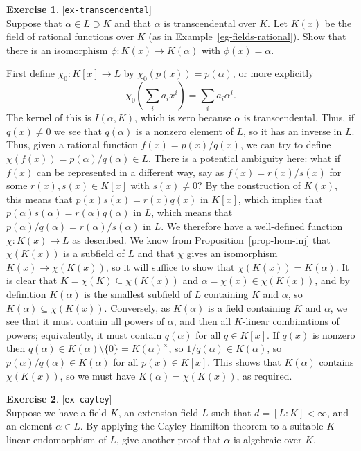 \documentclass{amsart}
\newcommand{\al}        {\alpha}
\newcommand{\sm}        {\setminus}
\newcommand{\tm}        {\times}
\newcommand{\sse}       {\subseteq}
\renewcommand{\:}{\colon}
\newcommand{\lastexlabel}{}
\newcommand{\exlabel}[1]{
 \global\def\lastexlabel{#1}\label{#1}[\texttt{#1}]\ \\
}
\newcommand{\exlabel}[1]{
 \global\def\lastexlabel{#1}\label{#1}
}
\newenvironment{solution}{\SolutionInline}{\endSolutionInline}
\theoremstyle{definition}
\newtheorem{exercise}{Exercise}[section]
\renewenvironment{solution}{\SolutionAtEnd}{\endSolutionAtEnd}
\begin{document}
\begin{exercise}\exlabel{ex-transcendental}
 Suppose that $\al\in L\supset K$ and that $\al$ is transcendental
 over $K$.  Let $K(x)$ be the field of rational functions over $K$ (as
 in Example~\ref{eg-fields-rational}).  Show that there is an
 isomorphism $\phi\:K(x)\to K(\al)$ with $\phi(x)=\al$.
\end{exercise}
\begin{solution}
 First define $\chi_0\:K[x]\to L$ by $\chi_0(p(x))=p(\al)$, or more
 explicitly 
 \[ \chi_0(\sum_ia_ix^i) = \sum_ia_i\al^i. \]
 The kernel of this is $I(\al,K)$, which is zero because $\al$ is
 transcendental.  Thus, if $q(x)\neq 0$ we see that $q(\al)$ is a
 nonzero element of $L$, so it has an inverse in $L$.  Thus, given a
 rational function $f(x)=p(x)/q(x)$, we can try to define
 $\chi(f(x))=p(\al)/q(\al)\in L$.  There is a potential ambiguity
 here: what if $f(x)$ can be represented in a different way, say as
 $f(x)=r(x)/s(x)$ for some $r(x),s(x)\in K[x]$ with $s(x)\neq 0$?  By
 the construction of $K(x)$, this means that $p(x)s(x)=r(x)q(x)$ in
 $K[x]$, which implies that $p(\al)s(\al)=r(\al)q(\al)$ in $L$, which
 means that $p(\al)/q(\al)=r(\al)/s(\al)$ in $L$.  We therefore have a
 well-defined function $\chi\:K(x)\to L$ as described.  We know from
 Proposition~\ref{prop-hom-inj} that $\chi(K(x))$ is a subfield of $L$
 and that $\chi$ gives an isomorphism $K(x)\to\chi(K(x))$, so it will
 suffice to show that $\chi(K(x))=K(\al)$.  It is clear that
 $K=\chi(K)\sse\chi(K(x))$  and $\al=\chi(x)\in\chi(K(x))$, and by
 definition $K(\al)$ is the smallest subfield of $L$ containing $K$
 and $\al$, so $K(\al)\sse\chi(K(x))$.  Conversely, as $K(\al)$ is a
 field containing $K$ and $\al$, we see that it must contain all
 powers of $\al$, and then all $K$-linear combinations of powers;
 equivalently, it must contain $q(\al)$ for all $q\in K[x]$.  If
 $q(x)$ is nonzero then $q(\al)\in K(\al)\sm\{0\}=K(\al)^\tm$, so
 $1/q(\al)\in K(\al)$, so $p(\al)/q(\al)\in K(\al)$ for all
 $p(x)\in K[x]$.  This shows that $K(\al)$ contains $\chi(K(x))$, so
 we must have $K(\al)=\chi(K(x))$, as required.
\end{solution}
\begin{exercise}\exlabel{ex-cayley}
 Suppose we have a field $K$, an extension field $L$ such that
 $d=[L:K]<\infty$, and an element $\al\in L$.  By applying the
 Cayley-Hamilton theorem to a suitable $K$-linear endomorphism of $L$,
 give another proof that $\al$ is algebraic over $K$.
\end{exercise}
\end{document}
